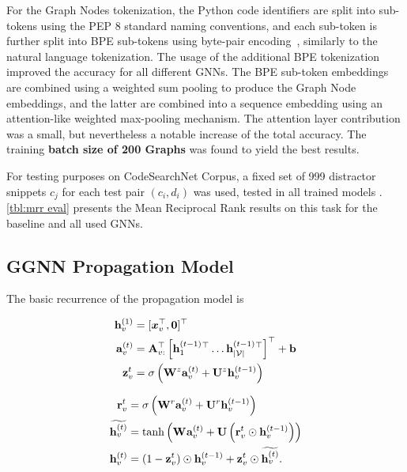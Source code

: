 \documentclass{article}
\begin{document}
For the Graph Nodes tokenization, the Python code identifiers are split into sub-tokens using the PEP 8 standard naming conventions,  and each sub-token is further split into BPE sub-tokens using byte-pair encoding~\cite{gage1994new,sennrich2016neural}, similarly to the natural language tokenization. The usage of the additional BPE tokenization improved the accuracy for all different GNNs. The BPE sub-token embeddings are combined using a weighted sum pooling to produce the Graph Node embeddings, and the latter are combined into a sequence embedding using an attention-like weighted max-pooling mechanism. The attention layer contribution was a small, but nevertheless a notable increase of the total accuracy.
The training \textbf{batch size of 200 Graphs} was found to yield the best results.

For testing purposes on CodeSearchNet Corpus, a fixed set
of 999 distractor snippets $c_j$ for each test pair $(c_i
, d_i)$ was used, tested in all trained models . \autoref{tbl:mrr eval} presents the Mean Reciprocal Rank results on this task for the baseline and all used GNNs.

\subsection{GGNN Propagation Model}

The basic recurrence of the propagation model is

\begin{center}
\small
\begin{minipage}{.48\linewidth}
\begin{align}
    \mathbf{h}_{v}^{(1)} & = [\boldsymbol{x}_v^\top, \mathbf{0}]^\top \label{eq:init}\\
    \mathbf{a}_{v}^{(t)} & = 
    \mathbf{A}_{v:}^\top  \left[\mathbf{h}_{1}^{(t-1)}{}^\top \ldots
\mathbf{h}_{|\mathcal{V}|}^{(t-1)}{}^\top\right]^\top + \mathbf{b} \label{eq:propagate-A} \\
    \mathbf{z}_{v}^{t} & =
    \sigma\left(\mathbf{W}_{}^{z}\mathbf{a}_{v}^{(t)} +
    \mathbf{U}^{z}\mathbf{h}_{v}^{(t-1)}\right) \label{eq:update-gate}
\end{align}
\end{minipage}
\hfill
\begin{minipage}{.48\linewidth}
\begin{align}
    \mathbf{r}_{v}^{t} & =
    \sigma\left(\mathbf{W}_{}^{r}\mathbf{a}_{v}^{(t)} +
    \mathbf{U}^{r}\mathbf{h}_{v}^{(t-1)}\right) \label{eq:reset-gate} \\
    \widetilde{\mathbf{h}_{v}^{(t)}} & =
    \mathrm{tanh}\left(\mathbf{W}_{}\mathbf{a}_{v}^{(t)} +
    \mathbf{U}\left(\mathbf{r}_{v}^{t}\odot\mathbf{h}_{v}^{(t-1)}\right)\right)
    \\
    \mathbf{h}_{v}^{(t)} & = (1 - \mathbf{z}_{v}^{t})\odot
    \mathbf{h}_{v}^{(t-1)} + \mathbf{z}_{v}^{t}\odot
    \widetilde{\mathbf{h}_{v}^{(t)}}.
\end{align}
\end{minipage}
\end{center}
\end{document}
